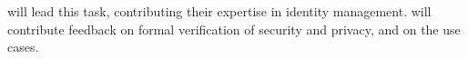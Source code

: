 \begin{Workpackage}{\thewpno}
\begin{Task}
\COGNIshort{} will lead this task, contributing their expertise in identity management. \USTANshort{} will contribute feedback on formal verification of security and privacy, and \SOPRAshort{} on the use cases.

\end{Task}

\begin{Task}



\end{Task}
\end{Workpackage}
